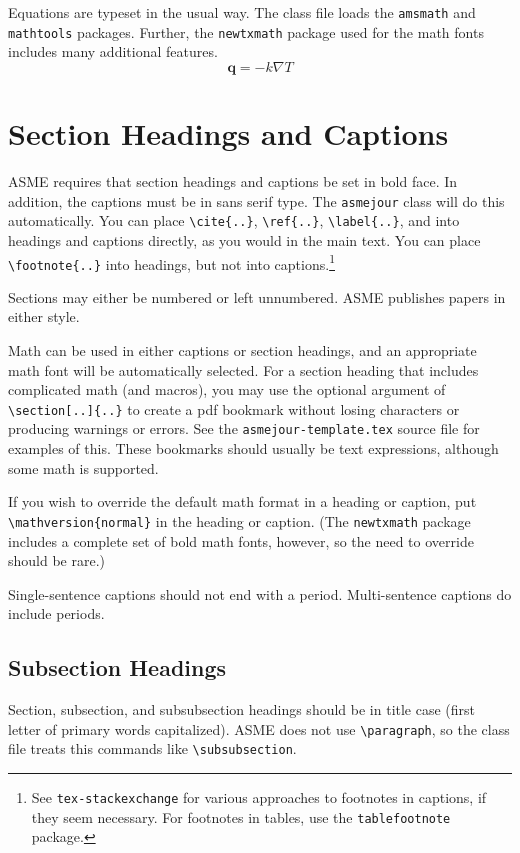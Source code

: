 \documentclass[largesc,upint,varvw,barcolor=Red4,nocopyright,hyphenate,balance,lang-second=french,lang=english]{asmejour}
\begin{document}
Equations are typeset in the usual way.  The class file loads the \texttt{amsmath} and \texttt{mathtools} packages. Further, the \texttt{newtxmath} package used for the math fonts includes many additional features.
\begin{equation}\label{eqn:1}
\mathbf{q} = -k\nabla T
\end{equation}


\section{Section Headings and Captions}

ASME requires that section headings and captions be set in bold face. In addition, the captions must be in sans serif type. The \texttt{asmejour} class will do this automatically.  You can place \verb|\cite{..}|, \verb|\ref{..}|, \verb|\label{..}|, and into headings and captions directly, as you would in the main text.  You can place \verb|\footnote{..}| into headings, but not into captions.\footnote{See \texttt{tex-stackexchange} for various approaches to footnotes in captions, if they seem necessary. For footnotes in tables, use the \texttt{tablefootnote} package.}

Sections may either be numbered or left unnumbered. ASME publishes papers in either style.

Math can be used in either captions or section headings, and an appropriate math font will be automatically selected. For a section heading that includes complicated math (and macros), you may use the optional argument of \verb|\section[..]{..}| to create a pdf bookmark without losing characters or producing warnings or errors. See the \texttt{asmejour-template.tex} source file for examples of this. These bookmarks should usually be text expressions, although some math is supported.  

If you wish to override the default math format in a heading or caption, put \verb|\mathversion{normal}| in the heading or caption. (The \texttt{newtxmath} package \cite{sharpe1} includes a complete set of bold math fonts, however, so the need to override should be rare.)

Single-sentence captions should not end with a period. Multi-sentence captions do include periods.

\subsection{Subsection Headings}
Section, subsection, and subsubsection headings should be in title case (first letter of primary words capitalized). ASME does not use \verb|\paragraph|, so the class file treats this commands like \verb|\subsubsection|. 
\end{document}
